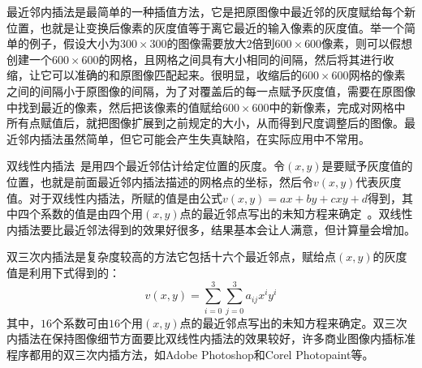 最近邻内插法是最简单的一种插值方法，它是把原图像中最近邻的灰度赋给每个新位置，也就是让变换后像素的灰度值等于离它最近的输入像素的灰度值。举一个简单的例子，假设大小为$300\times 300$的图像需要放大$2$倍到$600\times 600$像素，则可以假想创建一个$600\times 600$的网格，且网格之间具有大小相同的间隔，然后将其进行收缩，让它可以准确的和原图像匹配起来。很明显，收缩后的$600\times 600$网格的像素之间的间隔小于原图像的间隔，为了对覆盖后的每一点赋予灰度值，需要在原图像中找到最近的像素，然后把该像素的值赋给$600\times 600$中的新像素，完成对网格中所有点赋值后，就把图像扩展到之前规定的大小，从而得到尺度调整后的图像。最近邻内插法虽然简单，但它可能会产生失真缺陷，在实际应用中不常用。

双线性内插法~\cite{WangShen2008double}是用四个最近邻估计给定位置的灰度。令$(x,y)$是要赋予灰度值的位置，也就是前面最近邻内插法描述的网格点的坐标，然后令$v(x,y)$代表灰度值。对于双线性内插法，所赋的值是由公式$v(x,y)=ax+by+cxy+d$得到，其中四个系数的值是由四个用$(x,y)$点的最近邻点写出的未知方程来确定~\cite{Gonzalez2005book}。双线性内插法要比最近邻法得到的效果好很多，结果基本会让人满意，但计算量会增加。

双三次内插法是复杂度较高的方法它包括十六个最近邻点，赋给点$(x,y)$的灰度值是利用下式得到的：
\begin{equation}
v(x,y)=\sum_{i=0}^{3}\sum_{j=0}^{3}a_{ij}x^{i}y^{i}
\label{式2_13}
\end{equation}
其中，$16$个系数可由$16$个用$(x,y)$点的最近邻点写出的未知方程来确定。双三次内插法在保持图像细节方面要比双线性内插法的效果较好，许多商业图像内插标准程序都用的双三次内插方法，如Adobe Photoshop和Corel Photopaint等。



